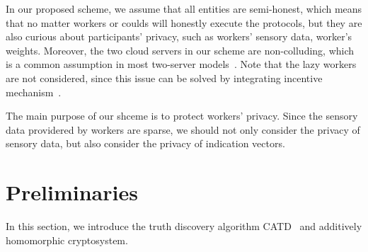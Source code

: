 \documentclass[conference]{IEEEtran}
\begin{document}
In our proposed scheme, we assume that all entities are semi-honest, which means that no matter workers or coulds will honestly execute the protocols, but they are also curious about participants' privacy, such as workers' sensory data, worker's weights.
Moreover, the two cloud servers in our scheme are non-colluding, which is a common assumption in most two-server models~\cite{zhang_lptd_2019,zhang_reliable_2019}.
Note that the lazy workers are not considered, since this issue can be solved by integrating incentive mechanism~\cite{xue_inpptd_2020}.

The main purpose of our shceme is to protect workers' privacy.
Since the sensory data providered by workers are sparse, we should not only consider the privacy of sensory data, but also consider the privacy of indication vectors.









\section{Preliminaries}\label{sec4}
In this section, we introduce the truth discovery algorithm CATD~\cite{li_confidence-aware_2014} and additively homomorphic cryptosystem.
\end{document}
